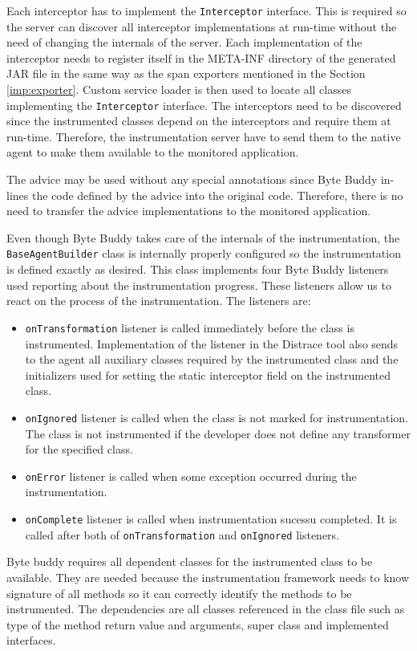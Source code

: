 Each interceptor has to implement the \texttt{Interceptor} interface. This is required so the server can discover all interceptor implementations at run-time without the need of changing the internals of the server. Each implementation of the interceptor needs to register itself in the META-INF directory of the generated JAR file in the same way as the span exporters mentioned in the Section \ref{imp:exporter}. Custom service loader is then used to locate all classes implementing the \texttt{Interceptor} interface. The interceptors need to be discovered since the instrumented classes depend on the interceptors and require them at run-time. Therefore, the instrumentation server have to send them to the native agent to make them available to the monitored application.

The advice may be used without any special annotations since Byte Buddy in-lines the code defined by the advice into the original code. Therefore, there is no need to transfer the advice implementations to the monitored application.

Even though Byte Buddy takes care of the internals of the instrumentation, the \texttt{BaseAgentBuilder} class is internally properly configured so the instrumentation is defined exactly as desired. This class implements four Byte Buddy listeners used reporting about the instrumentation progress. These listeners allow us to react on the process of the instrumentation. The listeners are:
\begin{itemize}
	\item \texttt{onTransformation} listener is called immediately before the class is instrumented. Implementation of the listener in the Distrace tool also sends to the agent all auxiliary classes required by the instrumented class and the initializers used for setting the static interceptor field on the instrumented class.
	\item \texttt{onIgnored} listener is called when the class is not marked for instrumentation. The class is not instrumented if the developer does not define any transformer for the specified class.
	\item \texttt{onError} listener is called when some exception occurred during the instrumentation.
	\item \texttt{onComplete} listener is called when instrumentation sucessu completed. It is called after both of \texttt{onTransformation} and \texttt{onIgnored} listeners.
\end{itemize}

Byte buddy requires all dependent classes for the instrumented class to be available. They are needed because the instrumentation framework needs to know signature of all methods so it can correctly identify the methods to be instrumented. The dependencies are all classes referenced in the class file such as type of the method return value and arguments, super class and implemented interfaces. 

